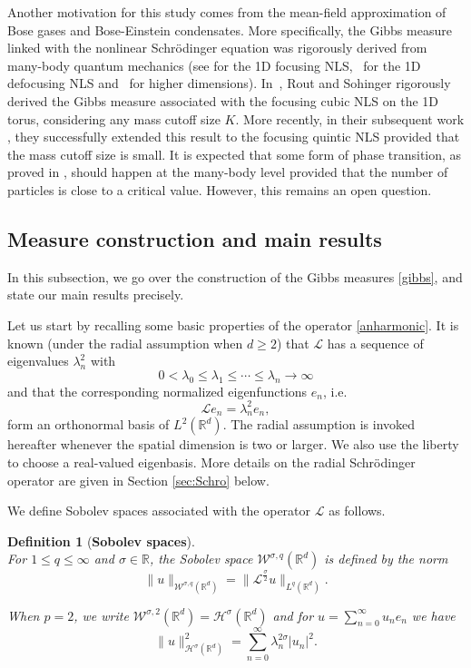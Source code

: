 \documentclass[%
11pt,  reqno]{amsart}
\newtheorem{definition}[theorem]{Definition}
\theoremstyle{remarkstyle}
\newcommand{\1}{\hspace{0.2mm}\text{I}\hspace{0.2mm}}
\newcommand{\noi}{\noindent}
\newcommand{\R}{\mathbb{R}}
\renewcommand{\L}{\mathcal{L}}
\newcommand{\ld}{\lambda}
\newcommand{\s}{\sigma}
\renewcommand{\H}{\mathcal{H}}
\numberwithin{equation}{section}
\numberwithin{theorem}{section}
\newcommand{\W}{\mathcal{W}}
\begin{document}
	Another motivation for this study comes from the mean-field approximation of Bose gases and Bose-Einstein condensates. More specifically, the Gibbs measure linked with the nonlinear Schr\"odinger equation was rigorously derived from many-body quantum mechanics (see \cite{RS22, RS23} for the 1D focusing NLS,~\cite{LNR15, LNR18, FKSS19,Sohinger-22} for the 1D defocusing NLS and~\cite{LewNamRou-20,FKSS17,FroKnoSchSoh-20b,FroKnoSchSoh-22} for higher dimensions). In~\cite{RS22}, Rout and Sohinger rigorously derived the Gibbs measure associated with the focusing cubic NLS on the 1D torus, considering any mass cutoff size $K$. More recently, in their subsequent work \cite{RS23}, they successfully extended this result to the focusing quintic NLS provided that the mass cutoff size is small. It is expected that some form of phase transition, as proved in \cite{OST22}, should happen at the many-body level provided that the number of particles is close to a critical value. However, this remains an open question.
	
	
	
	
	\subsection{Measure construction and main results}
	
	In this subsection, we go over the construction of the Gibbs measures \eqref{gibbs}, and state our main results precisely.  
	
	Let us start by recalling some basic properties of the operator \eqref{anharmonic}. It is known (under the radial assumption when $d\geq 2$) that $\L$ has a sequence of eigenvalues $\ld_n^2$ with 
	\[
	0 < \ld_0 \le \ld_1 \le \cdots \le \ld_n \to \infty 
	\]
	and that the corresponding normalized eigenfunctions $e_n$, i.e.
	\[
	\L e_n = \ld_n^2 e_n,
	\]
	form an orthonormal basis of $L^2(\R^d)$. The radial assumption is invoked hereafter whenever the spatial dimension is two or larger. We also use the liberty to choose a real-valued eigenbasis. More details on the radial Schr\"odinger operator are given in Section \ref{sec:Schro} below.
	
	We define Sobolev spaces associated with the operator $\L$ as follows.
	
	\begin{definition}[\textbf{Sobolev spaces}]\mbox{}\\
		\label{DEF:sob}
		For $1\le q \le \infty$
		and $\s \in \R$,
		the Sobolev space $\W^{\s,q} (\R^d)$ is defined by the norm
		\[
		\| u\|_{\W^{\s,q} (\R^d)} = \| \L^{\frac{\s}2} u\|_{L^q (\R^d)}.
		\]
		
		\noi
		When $p=2$,
		we write $\W^{\s,2} (\R^d) = \H^{\s} (\R^d)$
		and for $u = \sum_{n=0}^\infty u_n e_n$ we have
		$$\|u \|_{\H^{\s} (\R^d)}^2 = \sum_{n=0}^\infty \ld^{2\s}_n |u_n|^2.$$
	\end{definition}
	
\end{document}

